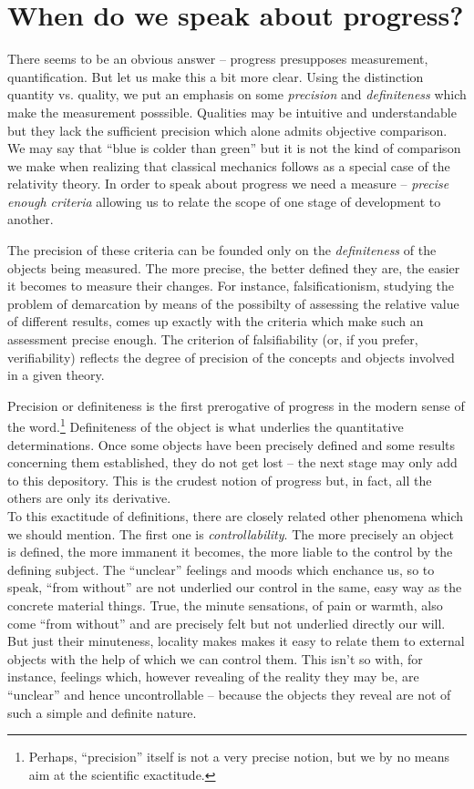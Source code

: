 \section{When do we speak about progress?}
There seems to be an obvious answer -- progress presupposes measurement,
quantification. But let us make this a bit more clear. Using the distinction quantity vs.
quality, we put an emphasis on some {\em precision} and {\em definiteness} 
which make the measurement posssible.
Qualities may be intuitive and understandable but they lack the sufficient
precision which alone admits objective comparison. We may say that ``blue is
colder than green'' but it is not the kind of comparison we make when realizing
that classical mechanics follows as a special case of the relativity theory. In 
order to speak about progress we need a measure -- {\em precise enough 
criteria} allowing us to relate the scope of one stage of development to 
another.

The precision of these criteria can be founded only on the {\em definiteness}
of the objects being measured. The more precise, the better defined they are,
the easier it becomes to measure their changes. For instance, falsificationism,
studying the problem of demarcation by means of the possibilty of assessing
the relative value of different results, comes up exactly with the criteria
which make such an assessment precise enough. The criterion of falsifiability
(or, if you prefer, verifiability) reflects the degree of precision of the 
concepts and objects involved in a given theory. 

Precision or definiteness is
the first prerogative of progress in the modern sense of the word.\footnote{
Perhaps, ``precision'' itself is not a very precise notion, but we by no means
 aim at the scientific exactitude.}
Definiteness of the object is what underlies the quantitative determinations.
Once some objects have been precisely defined and some results concerning
them established, they do not get lost -- the next stage may only add to this
depository. This is the crudest notion of progress but, in fact, all the 
others are only its derivative. \\[1ex]
To this exactitude of definitions, there are closely related other phenomena
which we should mention. The first one is {\em controllability}. The more
precisely an object is defined, the more immanent it becomes, the more liable
to the control by the defining subject. The ``unclear'' feelings and moods
which enchance us, so to speak, ``from without'' are not underlied our control
in the same, easy way as the concrete material things. True, the minute
sensations, of pain or warmth, also come ``from without'' and are precisely
felt but not underlied directly our will. But just their minuteness, locality
makes makes it easy to relate them to external objects with the help of which
we can control them. This isn't so with, for instance, feelings which,
however revealing of the reality they may be, are ``unclear'' and hence 
uncontrollable -- because the objects they reveal are not of such a simple
and definite nature.

